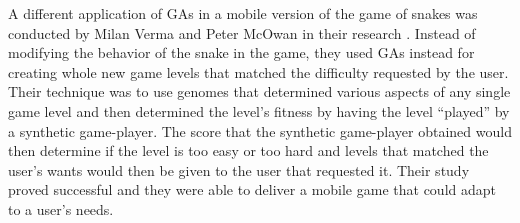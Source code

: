 A different application of GAs in a mobile version of the game of snakes was conducted by Milan Verma and Peter McOwan in their research \cite{Verma05}. Instead of modifying the behavior of the 
snake in the game, they used GAs instead for creating whole new game levels that matched the difficulty requested by the user. Their technique was to use genomes that determined various 
aspects of any single game level and then determined the level's fitness by having the level “played” by a synthetic game-player. The score that the synthetic game-player obtained would then determine 
if the level is too easy or too hard and levels that matched the user's wants would then be given to the user that requested it. Their study proved successful and they were able to deliver a 
mobile game that could adapt to a user's needs.